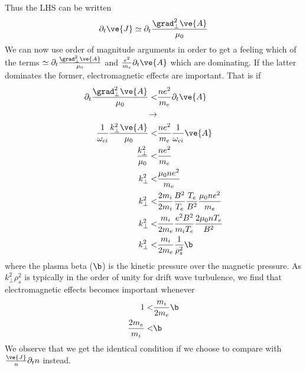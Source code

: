 %
Thus the LHS can be written
%
\begin{align*}
    \partial_t \ve{J} \simeq \partial_t \frac{\grad^2_\perp\ve{A}}{\mu_0}
\end{align*}
%
We can now use order of magnitude arguments in order to get a feeling which of
the terms
$\simeq \partial_t \frac{\grad^2_\perp\ve{A}}{\mu_0}$ and
$\frac{e^2}{m_e}\partial_t \ve{A}$ which are dominating. If the latter
dominates the former, electromagnetic effects are important. That is if
%
\begin{align*}
    \partial_t \frac{\grad^2_\perp\ve{A}}{\mu_0}
    < &
    \frac{ne^2}{m_e}\partial_t \ve{A}
    \\
    \rightarrow &
    \\
    \frac{1}{\omega_{ci}} \frac{k_\perp^2\ve{A}}{\mu_0}
    < &
    \frac{ne^2}{m_e}\frac{1}{\omega_{ci}} \ve{A}
    \\
    \frac{k_\perp^2}{\mu_0}
    < &
    \frac{ne^2}{m_e}
    \\
    k_\perp^2
    < &
    \frac{\mu_0ne^2}{m_e}
    \\
    k_\perp^2
    < &
    \frac{2m_i}{2m_i}\frac{B^2}{T_e}\frac{T_e}{B^2}\frac{\mu_0ne^2}{m_e}
    \\
    k_\perp^2
    < &
    \frac{m_i}{2m_e}\frac{e^2B^2}{m_iT_e}\frac{2\mu_0nT_e}{B^2}
    \\
    k_\perp^2
    < &
    \frac{m_i}{2m_e}\frac{1}{\rho_s^2}\b
\end{align*}
%
where the plasma beta ($\b$) is the kinetic pressure over the magnetic
pressure. As
$ k_\perp^2\rho_s^2$ is typically in the order of unity for drift wave
turbulence, we find that electromagnetic effects becomes important whenever
%
\begin{align*}
    1
    < &
    \frac{m_i}{2m_e}\b
    \\
    \frac{2m_e}{m_i}
    < &
    \b
\end{align*}
%
We observe that we get the identical condition if we choose to compare with
$\frac{\ve{J}}{n}\partial_t n$ instead.

